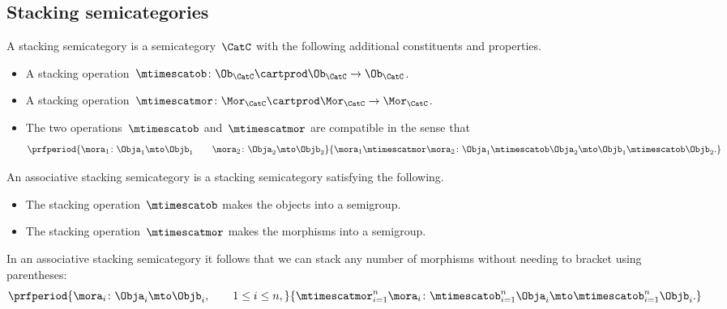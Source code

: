 \subsection{Stacking semicategories}

\begin{ctdefinition}
    \label{def:simple-stacking-semi-cat}
    A stacking semicategory is a semicategory~$\CatC$ with the following additional constituents and properties.

    \constit
    \begin{itemize}
        \item A stacking operation~$\mtimescatob \colon \Ob_\CatC \cartprod \Ob_\CatC \to \Ob_\CatC$.
        \item A stacking operation~$\mtimescatmor \colon \Mor_\CatC \cartprod \Mor_\CatC \to \Mor_\CatC$.
    \end{itemize}

    \condit
    \begin{itemize}
        \item The two operations~$\mtimescatob$ and~$\mtimescatmor$ are compatible in the sense that
              \begin{equation}
                  \prfperiod{
                      \mora_1 \colon \Obja_1 \mto \Objb_1
                      \qquad
                      \mora_2 \colon \Obja_2 \mto \Objb_2
                  }{
                      \mora_1 \mtimescatmor \mora_2 \colon  \Obja_1 \mtimescatob  \Obja_2 \mto \Objb_1 \mtimescatob \Objb_2.
                  }
              \end{equation}
    \end{itemize}
\end{ctdefinition}

\begin{ctdefinition}
    \label{def:stacking-semi-cat}
    An associative stacking semicategory is a stacking semicategory satisfying the following.

    \condit
    \begin{itemize}
        \item The stacking operation~$\mtimescatob$ makes the objects into a semigroup.
        \item The stacking operation~$\mtimescatmor$ makes the morphisms into a semigroup.
    \end{itemize}
\end{ctdefinition}

\begin{remark}
    In an associative stacking semicategory it follows that we can stack any number of morphisms without needing to bracket using parentheses:
    \begin{equation}
        \prfperiod{
            \mora_i \colon \Obja_i \mto \Objb_i, \qquad 1 \leq i \leq n,
        }{
            \mtimescatmor_{i=1}^n \mora_i \colon  \mtimescatob_{i=1}^n \Obja_i \mto \mtimescatob_{i=1}^n \Objb_i.
        }
    \end{equation}
\end{remark}

